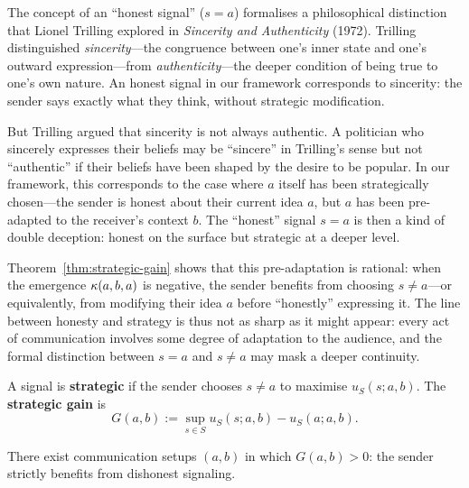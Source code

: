 \begin{interpretation}
\label{interp:ch13:honesty_sincerity}
The concept of an ``honest signal'' ($s = a$) formalises a philosophical
distinction that Lionel Trilling explored in \emph{Sincerity and
Authenticity} (1972).  Trilling distinguished \emph{sincerity}---the
congruence between one's inner state and one's outward expression---from
\emph{authenticity}---the deeper condition of being true to one's own
nature.  An honest signal in our framework corresponds to sincerity: the
sender says exactly what they think, without strategic modification.

But Trilling argued that sincerity is not always authentic.  A politician
who sincerely expresses their beliefs may be ``sincere'' in Trilling's sense
but not ``authentic'' if their beliefs have been shaped by the desire to be
popular.  In our framework, this corresponds to the case where $a$ itself
has been strategically chosen---the sender is honest about their current
idea $a$, but $a$ has been pre-adapted to the receiver's context $b$.  The
``honest'' signal $s = a$ is then a kind of double deception: honest on the
surface but strategic at a deeper level.

Theorem~\ref{thm:strategic-gain} shows that this pre-adaptation is rational:
when the emergence $\kappa(a, b, a)$ is negative, the sender benefits from
choosing $s \neq a$---or equivalently, from modifying their idea $a$ before
``honestly'' expressing it.  The line between honesty and strategy is thus
not as sharp as it might appear: every act of communication involves some
degree of adaptation to the audience, and the formal distinction between
$s = a$ and $s \neq a$ may mask a deeper continuity.
\end{interpretation}



\begin{definition}
\label{def:strategic}
A signal is \textbf{strategic} if the sender chooses $s \neq a$ to maximise
$u_S(s; a, b)$.  The \textbf{strategic gain} is
\[
  G(a, b) := \sup_{s \in S} u_S(s; a, b) - u_S(a; a, b).
\]
\end{definition}

\begin{theorem}
\label{thm:strategic-gain}
There exist communication setups $(a, b)$ in which $G(a, b) > 0$: the
sender strictly benefits from dishonest signaling.
\end{theorem}

